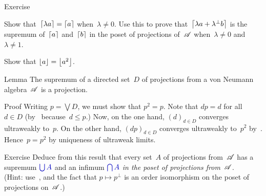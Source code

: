 \documentclass[a]{subfiles}
\begin{document}
\begin{parsec}
\begin{point}{Exercise}
\begin{point}
Show that~$\left\lceil\lambda a\right\rceil = \left\lceil a\right\rceil$
when~$\lambda\neq 0$.
Use this to prove that~$\left\lceil\lambda a+\lambda^\perp b\right\rceil$
is the supremum of~$\left\lceil a\right\rceil$ and~$\left\lceil b\right\rceil$
in the poset of projections of~$\mathscr{A}$
when~$\lambda\neq 0$ and~$\lambda\neq 1$.
\end{point}
\begin{point}%
Show that $\left\lfloor a\right\rfloor=\left\lfloor a^2\right\rfloor$.
\end{point}
\end{point}
\begin{point}{Lemma}%
The supremum of a directed set~$D$ of projections
from a von Neumann algebra~$\mathscr{A}$ is a projection.
\begin{point}{Proof}%
Writing $p=\bigvee D$,
we must show that $p^2=p$.
Note that $dp=d$ for all~$d\in D$
(by~ because~$d\leq p$.)
Now, on the one hand, $(d)_{d\in D}$
converges ultraweakly to~$p$.
On the other hand,
$(dp)_{d\in D}$
converges ultraweakly to~$p^2$ by~.
Hence~$p=p^2$ by uniqueness of ultraweak limits.
\end{point}
\end{point}
\begin{point}{Exercise}%
Deduce from this result
 that every set~$A$ of projections from~$\mathscr{A}$
has a supremum $\Define{\bigcup A}$
and an infimum $\Define{\bigcap A}$
\emph{in the poset of projections from~$\mathscr{A}$}.\\
(Hint: use~,
and the fact that $p\mapsto p^\perp$ 
is an order isomorphism on the poset of projections on~$\mathscr{A}$.)
\end{point}
\end{parsec}
\end{document}
